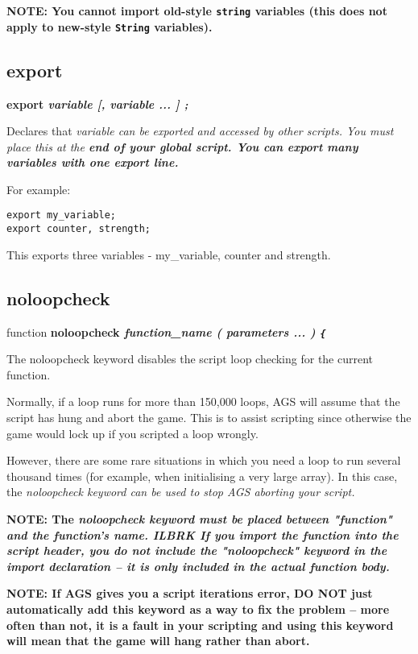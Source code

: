 \bf{NOTE:} You cannot import old-style \verb$string$ variables (this does not
apply to new-style \verb$String$ variables).


\subsection{export}\label{exportkeyword}%

\bf{export} \it{variable} [, \it{variable} ... ] ;

Declares that \it{variable} can be exported and accessed by other scripts. You must place
this at the \bf{end} of your global script. You can export many variables with one export
line.

For example:

\begin{verbatim}
export my_variable;
export counter, strength;
\end{verbatim}

This exports three variables - my_variable, counter and strength.


\subsection{noloopcheck}\label{noloopcheck}%

function \bf{noloopcheck} \it{function_name} ( \it{parameters ...} ) \verb${$

The noloopcheck keyword disables the script loop checking for the current function.

Normally, if a  loop runs for more than 150,000
loops, AGS will assume that the script has hung and abort the game. This is to assist
scripting since otherwise the game would lock up if you scripted a loop wrongly.

However, there are some rare situations in which you need a loop to run several thousand
times (for example, when initialising a very large array). In this case, the \it{noloopcheck}
keyword can be used to stop AGS aborting your script.

\bf{NOTE:} The \it{noloopcheck} keyword must be placed between "function" and the function's name. ILBRK
If you import the function into the script header, you \bf{do not} include the "noloopcheck" keyword
in the import declaration -- it is only included in the actual function body.

\bf{NOTE:} If AGS gives you a script iterations error, \bf{DO NOT} just automatically
add this keyword as a way to fix the problem -- more often than not, it is a fault in
your scripting and using this keyword will mean that the game will hang rather than abort.

